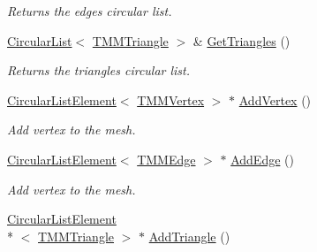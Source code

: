 \begin{DoxyCompactItemize}
\begin{DoxyCompactList}\small\item\em Returns the edges circular list. \end{DoxyCompactList}\item 
\hypertarget{class_h_a_c_d_1_1_t_m_mesh_a5a888387d7c5ed871dafcdd8c17fa435}{\hyperlink{class_h_a_c_d_1_1_circular_list}{Circular\+List}$<$ \hyperlink{class_h_a_c_d_1_1_t_m_m_triangle}{T\+M\+M\+Triangle} $>$ \& \hyperlink{class_h_a_c_d_1_1_t_m_mesh_a5a888387d7c5ed871dafcdd8c17fa435}{Get\+Triangles} ()}\label{class_h_a_c_d_1_1_t_m_mesh_a5a888387d7c5ed871dafcdd8c17fa435}

\begin{DoxyCompactList}\small\item\em Returns the triangles circular list. \end{DoxyCompactList}\item 
\hypertarget{class_h_a_c_d_1_1_t_m_mesh_a821b9b7dcb2818d07d3014d6e2fc0dfb}{\hyperlink{class_h_a_c_d_1_1_circular_list_element}{Circular\+List\+Element}$<$ \hyperlink{class_h_a_c_d_1_1_t_m_m_vertex}{T\+M\+M\+Vertex} $>$ $\ast$ \hyperlink{class_h_a_c_d_1_1_t_m_mesh_a821b9b7dcb2818d07d3014d6e2fc0dfb}{Add\+Vertex} ()}\label{class_h_a_c_d_1_1_t_m_mesh_a821b9b7dcb2818d07d3014d6e2fc0dfb}

\begin{DoxyCompactList}\small\item\em Add vertex to the mesh. \end{DoxyCompactList}\item 
\hypertarget{class_h_a_c_d_1_1_t_m_mesh_a4a7c6cf7c8c36a2fb921a5ed6d5ab188}{\hyperlink{class_h_a_c_d_1_1_circular_list_element}{Circular\+List\+Element}$<$ \hyperlink{class_h_a_c_d_1_1_t_m_m_edge}{T\+M\+M\+Edge} $>$ $\ast$ \hyperlink{class_h_a_c_d_1_1_t_m_mesh_a4a7c6cf7c8c36a2fb921a5ed6d5ab188}{Add\+Edge} ()}\label{class_h_a_c_d_1_1_t_m_mesh_a4a7c6cf7c8c36a2fb921a5ed6d5ab188}

\begin{DoxyCompactList}\small\item\em Add vertex to the mesh. \end{DoxyCompactList}\item 
\hypertarget{class_h_a_c_d_1_1_t_m_mesh_a75fd0bc275941afac1fdde463f9493b4}{\hyperlink{class_h_a_c_d_1_1_circular_list_element}{Circular\+List\+Element}\\*
$<$ \hyperlink{class_h_a_c_d_1_1_t_m_m_triangle}{T\+M\+M\+Triangle} $>$ $\ast$ \hyperlink{class_h_a_c_d_1_1_t_m_mesh_a75fd0bc275941afac1fdde463f9493b4}{Add\+Triangle} ()}\label{class_h_a_c_d_1_1_t_m_mesh_a75fd0bc275941afac1fdde463f9493b4}


\end{DoxyCompactItemize}
